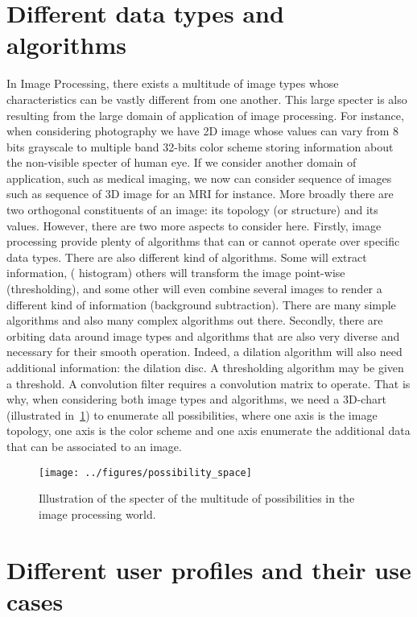 \section*{Different data types and algorithms}

In Image Processing, there exists a multitude of image types whose characteristics can be vastly different from one
another. This large specter is also resulting from the large domain of application of image processing. For instance,
when considering photography we have 2D image whose values can vary from 8 bits grayscale to multiple band 32-bits color
scheme storing information about the non-visible specter of human eye. If we consider another domain of application,
such as medical imaging, we now can consider sequence of images such as sequence of 3D image for an MRI for instance.
More broadly there are two orthogonal constituents of an image: its topology (or structure) and its values. However,
there are two more aspects to consider here. Firstly, image processing provide plenty of algorithms that can or cannot
operate over specific data types. There are also different kind of algorithms. Some will extract information, (\eg
histogram) others will transform the image point-wise (\eg thresholding), and some other will even combine several
images to render a different kind of information (\eg background subtraction). There are many simple algorithms and
also many complex algorithms out there. Secondly, there are orbiting data around image types and algorithms that are
also very diverse and necessary for their smooth operation. Indeed, a dilation algorithm will also need additional
information: the dilation disc. A thresholding algorithm may be given a threshold. A convolution filter requires a
convolution matrix to operate. That is why, when considering both image types and algorithms, we need a 3D-chart
(illustrated in~\cref{fig:int.possibility_space}) to enumerate all possibilities, where one axis is the image topology,
one axis is the color scheme and one axis enumerate the additional data that can be associated to an image.


\begin{figure}[htbp]
  \centering
  \texttt{[image: ../figures/possibility\_space]}
  \caption{Illustration of the specter of the multitude of possibilities in the image processing world.}
  \label{fig:int.possibility_space}
\end{figure}


\section*{Different user profiles and their use cases}

